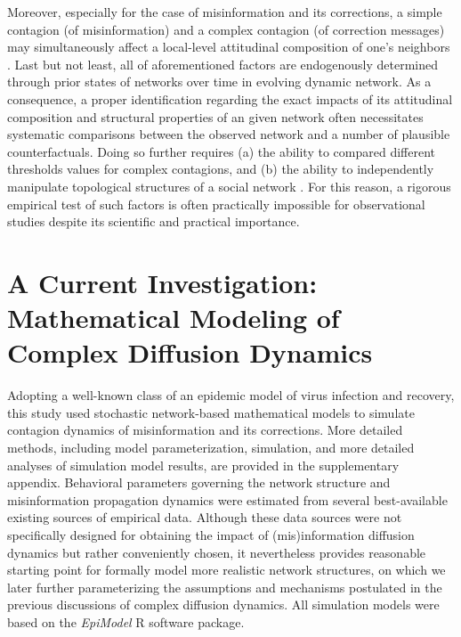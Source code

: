 \documentclass[man, 12pt, a4paper, noextraspace]{apa6}
\begin{document}
    Moreover, especially for the case of misinformation and its corrections, a simple contagion (of misinformation) and a complex contagion (of correction messages) may simultaneously affect a local-level attitudinal composition of one's neighbors \parencite[i.e., those who endorse and believe misinformation vs. those who do not: e.g.,][]{campbell2013complex}. Last but not least, all of aforementioned factors are endogenously determined through prior states of networks over time in evolving dynamic network. As a consequence, a proper identification regarding the exact impacts of its attitudinal composition and structural properties of an given network often necessitates systematic comparisons between the observed network and a number of plausible counterfactuals. Doing so further requires (a) the ability to compared different thresholds values for complex contagions, and (b) the ability to independently manipulate topological structures of a social network \parencite[e.g.,][]{Centola2010Sience, Centola2007449}. For this reason, a rigorous empirical test of such factors is often practically impossible for observational studies despite its scientific and practical importance. 
    
\section{A Current Investigation: Mathematical Modeling of Complex Diffusion Dynamics}

  Adopting a well-known class of an epidemic model of virus infection and recovery, this study used stochastic network-based mathematical models to simulate contagion dynamics of misinformation and its corrections. More detailed methods, including model parameterization, simulation, and more detailed analyses of simulation model results, are provided in the supplementary appendix. Behavioral parameters governing the network structure and misinformation propagation dynamics were estimated from several best-available existing sources of empirical data. Although these data sources were not specifically designed for obtaining the impact of (mis)information diffusion dynamics but rather conveniently chosen, it nevertheless provides reasonable starting point for formally model more realistic network structures, on which we later further parameterizing the assumptions and mechanisms postulated in the previous discussions of complex diffusion dynamics. All simulation models were based on the \emph{EpiModel} R software package.
    
\end{document}

